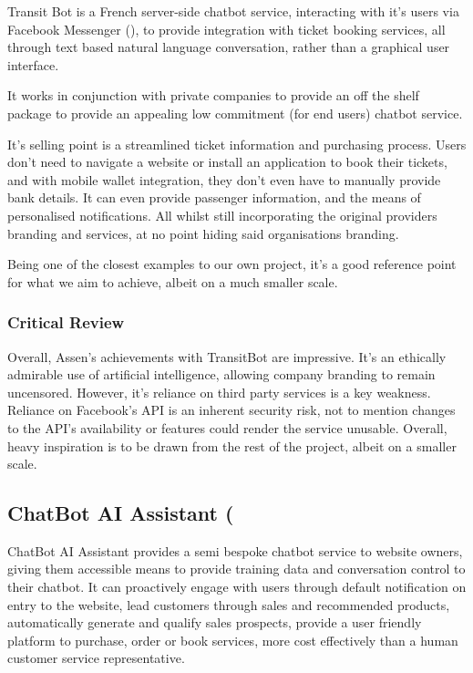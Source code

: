 \documentclass[11pt]{article}
\begin{document}
Transit Bot is a French server-side chatbot service, interacting with it's users via Facebook Messenger (\cite{messenger}), to provide integration with ticket booking services, all through text based natural language conversation, rather than a graphical user interface.

It works in conjunction with private companies to provide an off the shelf package to provide an appealing low commitment (for end users) chatbot service.

It's selling point is a streamlined ticket information and purchasing process. Users don't need to navigate a website or install an application to book their tickets, and with mobile wallet integration, they don't even have to manually provide bank details. It can even provide passenger information, and the means of personalised notifications. All whilst still incorporating the original providers branding and services, at no point hiding said organisations branding.

Being one of the closest examples to our own project, it's a good reference point for what we aim to achieve, albeit on a much smaller scale.

\subsubsection{Critical Review}
Overall, Assen's achievements with TransitBot are impressive. It's an ethically admirable use of artificial intelligence, allowing company branding to remain uncensored. However, it's reliance on third party services is a key weakness. Reliance on Facebook's API is an inherent security risk, not to mention changes to the API's availability or features could render the service unusable. Overall, heavy inspiration is to be drawn from the rest of the project, albeit on a smaller scale.

\subsection{ChatBot AI Assistant (\texorpdfstring{\cite{chatbotai-assist}})} \label{chatbot-ai-assistant}

ChatBot AI Assistant provides a semi bespoke chatbot service to website owners, giving them accessible means to provide training data and conversation control to their chatbot. It can proactively engage with users through default notification on entry to the website, lead customers through sales and recommended products, automatically generate and qualify sales prospects, provide a user friendly platform to purchase, order or book services, more cost effectively than a human customer service representative.
\end{document}
